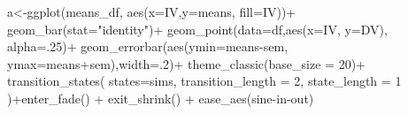 \documentclass[
  letterpaper,
  DIV=11,
  numbers=noendperiod]{scrreprt}
\newenvironment{Shaded}{\begin{snugshade}}{\end{snugshade}}
\newcommand{\AttributeTok}[1]{\textcolor[rgb]{0.40,0.45,0.13}{#1}}
\newcommand{\DecValTok}[1]{\textcolor[rgb]{0.68,0.00,0.00}{#1}}
\newcommand{\FunctionTok}[1]{\textcolor[rgb]{0.28,0.35,0.67}{#1}}
\newcommand{\NormalTok}[1]{\textcolor[rgb]{0.00,0.23,0.31}{#1}}
\newcommand{\OtherTok}[1]{\textcolor[rgb]{0.00,0.23,0.31}{#1}}
\newcommand{\SpecialCharTok}[1]{\textcolor[rgb]{0.37,0.37,0.37}{#1}}
\newcommand{\StringTok}[1]{\textcolor[rgb]{0.13,0.47,0.30}{#1}}
\begin{document}
\begin{Shaded}
\begin{Highlighting}[]
\NormalTok{a}\OtherTok{\textless{}{-}}\FunctionTok{ggplot}\NormalTok{(means\_df, }\FunctionTok{aes}\NormalTok{(}\AttributeTok{x=}\NormalTok{IV,}\AttributeTok{y=}\NormalTok{means, }\AttributeTok{fill=}\NormalTok{IV))}\SpecialCharTok{+}
  \FunctionTok{geom\_bar}\NormalTok{(}\AttributeTok{stat=}\StringTok{"identity"}\NormalTok{)}\SpecialCharTok{+}
  \FunctionTok{geom\_point}\NormalTok{(}\AttributeTok{data=}\NormalTok{df,}\FunctionTok{aes}\NormalTok{(}\AttributeTok{x=}\NormalTok{IV, }\AttributeTok{y=}\NormalTok{DV), }\AttributeTok{alpha=}\NormalTok{.}\DecValTok{25}\NormalTok{)}\SpecialCharTok{+}
  \FunctionTok{geom\_errorbar}\NormalTok{(}\FunctionTok{aes}\NormalTok{(}\AttributeTok{ymin=}\NormalTok{means}\SpecialCharTok{{-}}\NormalTok{sem, }\AttributeTok{ymax=}\NormalTok{means}\SpecialCharTok{+}\NormalTok{sem),}\AttributeTok{width=}\NormalTok{.}\DecValTok{2}\NormalTok{)}\SpecialCharTok{+}
  \FunctionTok{theme\_classic}\NormalTok{(}\AttributeTok{base\_size =} \DecValTok{20}\NormalTok{)}\SpecialCharTok{+}
  \FunctionTok{transition\_states}\NormalTok{(}
    \AttributeTok{states=}\NormalTok{sims,}
    \AttributeTok{transition\_length =} \DecValTok{2}\NormalTok{,}
    \AttributeTok{state\_length =} \DecValTok{1}
\NormalTok{  )}\SpecialCharTok{+}\FunctionTok{enter\_fade}\NormalTok{() }\SpecialCharTok{+} 
  \FunctionTok{exit\_shrink}\NormalTok{() }\SpecialCharTok{+}
  \FunctionTok{ease\_aes}\NormalTok{(}\StringTok{\textquotesingle{}sine{-}in{-}out\textquotesingle{}}\NormalTok{)}


\end{Highlighting}
\end{Shaded}
\end{document}
